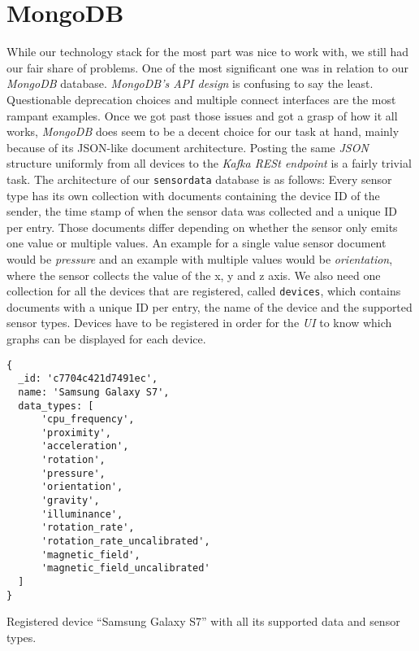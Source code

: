 \section{MongoDB}

While our technology stack for the most part was nice to work with, we still had our fair share of
problems. One of the most significant one was in relation to our \textit{MongoDB} database.
\textit{MongoDB’s API design} is confusing to say the least. Questionable deprecation choices and
multiple connect interfaces are the most rampant examples. Once we got past those issues and got a
grasp of how it all works, \textit{MongoDB} does seem to be a decent choice for our task at hand,
mainly because of its JSON-like document architecture. Posting the same \textit{JSON} structure
uniformly from all devices to the \textit{Kafka RESt endpoint} is a fairly trivial task. The
architecture of our \texttt{sensordata} database is as follows: Every sensor type has its own
collection with documents containing the device ID of the sender, the time stamp of when the sensor
data was collected and a unique ID per entry. Those documents differ depending on whether the sensor
only emits one value or multiple values. An example for a single value sensor document would be
\textit{pressure} and an example with multiple values would be \textit{orientation}, where the
sensor collects the value of the x, y and z axis. We also need one collection for all the devices
that are registered, called \texttt{devices}, which contains documents with a unique ID per entry,
the name of the device and the supported sensor types. Devices have to be registered in order for
the \textit{UI} to know which graphs can be displayed for each device.

\begin{code}[H]
  \centering
  \begin{lstlisting}[language=mongo]
{
  _id: 'c7704c421d7491ec',
  name: 'Samsung Galaxy S7',
  data_types: [
      'cpu_frequency',
      'proximity',
      'acceleration',
      'rotation',
      'pressure',
      'orientation',
      'gravity',
      'illuminance',
      'rotation_rate',
      'rotation_rate_uncalibrated',
      'magnetic_field',
      'magnetic_field_uncalibrated'
  ]
}
  \end{lstlisting}
  \caption{Registered device “Samsung Galaxy S7” with all its supported data and sensor types.}
\end{code}

